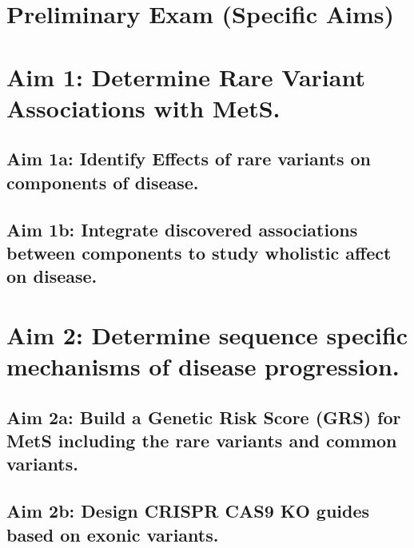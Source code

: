 \documentclass{article}
\begin{document}
\section*{Preliminary Exam (Specific Aims)}



\section*{Aim 1: Determine Rare Variant Associations with MetS.}

\subsection*{Aim 1a: Identify Effects of rare variants on components of disease.}

\subsection*{Aim 1b: Integrate discovered associations between components to study wholistic affect on disease.}

\section*{Aim 2: Determine sequence specific mechanisms of disease progression.}

\subsection*{Aim 2a: Build a Genetic Risk Score (GRS) for MetS including the rare variants and common variants.}

\subsection*{Aim 2b: Design CRISPR CAS9 KO guides based on exonic variants.}
\end{document}

